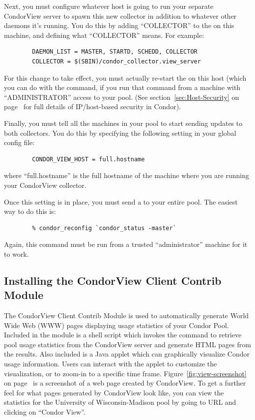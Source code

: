 Next, you must configure whatever host is going to run your separate
CondorView server to spawn this new collector in addition to whatever
other daemons it's running.
You do this by adding ``COLLECTOR'' to the  on
this machine, and defining what ``COLLECTOR'' means.
For example:
\begin{verbatim}
        DAEMON_LIST = MASTER, STARTD, SCHEDD, COLLECTOR
        COLLECTOR = $(SBIN)/condor_collector.view_server
\end{verbatim}
For this change to take effect, you must actually re-start the
 on this host (which you can do with the
 command, if you run that command from a machine with 
``ADMINISTRATOR'' access to your pool.
(See section~\ref{sec:Host-Security} on
page~\pageref{sec:Host-Security} for full details of IP/host-based
security in Condor).

Finally, you must tell all the machines in your pool to start sending
updates to both collectors.
You do this by specifying the following setting in your global config
file:
\begin{verbatim}
        CONDOR_VIEW_HOST = full.hostname
\end{verbatim}
where ``full.hostname'' is the full hostname of the machine where you
are running your CondorView collector.

Once this setting is in place, you must send a  to
your entire pool.  The easiest way to do this is:
\begin{verbatim}
        % condor_reconfig `condor_status -master`
\end{verbatim}
Again, this command must be run from a trusted ``administrator''
machine for it to work.  

\subsection{\label{sec:CondorView-Client-Install}
Installing the CondorView Client Contrib Module} 

\newcommand{\MakeStats}{\Prog{make\_stats}}

The CondorView Client Contrib Module is used to automatically generate
World Wide Web (WWW) pages displaying usage statistics of your Condor
Pool.
Included in the module is a shell script which invokes the 
command to retrieve pool usage statistics from the CondorView server and
generate HTML pages from the results.  
Also included is a Java applet which can graphically visualize Condor 
usage information.  
Users can interact with the applet to customize the visualization, or to
zoom-in to a specific time frame.
Figure~\ref{fig:view-screenshot} on page~\pageref{fig:view-screenshot}
is a screenshot of a web page created by CondorView.  
To get a further feel for what pages generated by CondorView look like,
you can view the statistics for the University of Wisconsin-Madison pool
by going to URL  and clicking on
``Condor View''.

